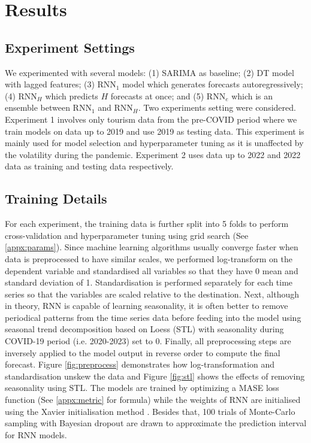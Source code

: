 \documentclass{article}
\begin{document}
\section{Results}

\subsection{Experiment Settings}
We experimented with several models: (1) SARIMA as baseline; (2) DT model with lagged features; (3) RNN$_1$ model which generates forecasts autoregressively; (4) RNN$_{H}$ which predicts $H$ forecasts at once; and (5) RNN$_e$ which is an ensemble between RNN$_1$ and RNN$_{H}$. Two experiments setting were considered. Experiment 1 involves only tourism data from the pre-COVID period where we train models on data up to 2019 and use 2019 as testing data. This experiment is mainly used for model selection and hyperparameter tuning as it is unaffected by the volatility during the pandemic. Experiment 2 uses data up to 2022 and 2022 data as training and testing data respectively.

\subsection{Training Details}
For each experiment, the training data is further split into 5 folds to perform cross-validation and hyperparameter tuning using grid search (See \ref{appx:params}). Since machine learning algorithms usually converge faster when data is preprocessed to have similar scales, we performed log-transform on the dependent variable and standardised all variables so that they have 0 mean and standard deviation of 1. Standardisation is performed separately for each time series so that the variables are scaled relative to the destination. Next, although in theory, RNN is capable of learning seasonality, it is often better to remove periodical patterns from the time series data before feeding into the model using seasonal trend decomposition based on Loess (STL) \cite{stl} with seasonality during COVID-19 period (i.e. 2020-2023) set to 0. Finally, all preprocessing steps are inversely applied to the model output in reverse order to compute the final forecast. Figure \ref{fig:preprocess} demonstrates how log-transformation and standardisation unskew the data and Figure \ref{fig:stl} shows the effects of removing seasonality using STL. The models are trained by optimizing a MASE loss function (See \ref{appx:metric} for formula) while the weights of RNN are initialised using the Xavier initialisation method \cite{xavier}. Besides that, 100 trials of Monte-Carlo sampling with Bayesian dropout are drawn to approximate the prediction interval for RNN models.
\end{document}
